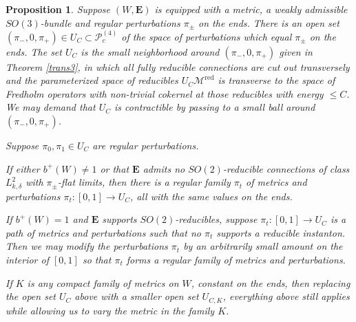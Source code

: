 \documentclass[10pt,a4paper]{amsart}
\newtheorem{proposition}[theorem]{Proposition}
\theoremstyle{definition}
\theoremstyle{remark}
\numberwithin{figure}{qchap}
\begin{document}
\begin{proposition}\label{famtrans}Suppose $(W,\mathbf{E})$ is equipped with a metric, a weakly admissible $SO(3)$-bundle and regular perturbations $\pi_\pm$ on the ends. There is an open set $(\pi_-, 0, \pi_+) \in U_C \subset \mathcal P^{(4)}_c$ of the space of perturbations which equal $\pi_\pm$ on the ends. The set $U_C$ is the small neighborhood around $(\pi_-, 0, \pi_+)$ given in Theorem \ref{trans3}, in which all fully reducible connections are cut out transversely and the parameterized space of reducibles $U_C \mathcal M^{\text{red}}$ is transverse to the space of Fredholm operators with non-trivial cokernel at those reducibles with energy $\leq C$. We may demand that $U_C$ is contractible by passing to a small ball around $(\pi_-, 0, \pi_+)$.

Suppose $\pi_0, \pi_1 \in U_C$ are regular perturbations.

If either $b^+(W) \neq 1$ or that $\mathbf{E}$ admits no $SO(2)$-reducible connections of class $L^2_{k,\delta}$ with $\pi_\pm$-flat limits, then there is a regular family $\pi_t$ of metrics and perturbations $\pi_t: [0,1] \to U_C$, all with the same values on the ends.

If $b^+(W) = 1$ and $\mathbf{E}$ supports $SO(2)$-reducibles, suppose $\pi_t: [0,1] \to U_C$ is a path of metrics and perturbations such that no $\pi_t$ supports a reducible instanton. Then we may modify the perturbations $\pi_t$ by an arbitrarily small amount on the interior of $[0,1]$ so that $\pi_t$ forms a regular family of metrics and perturbations.

If $K$ is any compact family of metrics on $W$, constant on the ends, then replacing the open set $U_C$ above with a smaller open set $U_{C,K}$, everything above still applies while allowing us to vary the metric in the family $K$.
\end{proposition}
\end{document}
